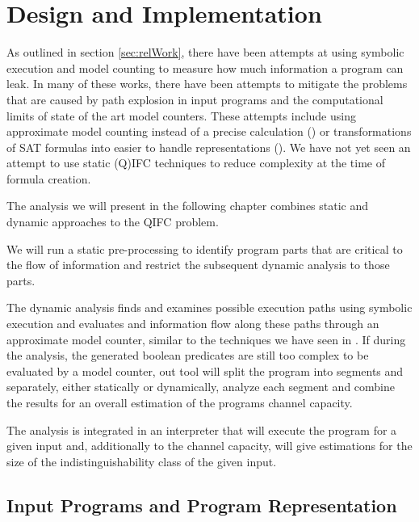 \chapter{Design and Implementation}\label{sec:impl}

As outlined in section \ref{sec:relWork}, there have been attempts at using symbolic execution and model counting to measure how much information a program can leak. In many of these works, there have been attempts to mitigate the problems that are caused by path explosion in input programs and the computational limits of state of the art model counters. These attempts include using approximate model counting instead of a precise calculation (\cite{biondi18, chu19}) or transformations of SAT formulas into easier to handle representations (\cite{klebanov13}). We have not yet seen an attempt to use static (Q)IFC techniques to reduce complexity at the time of formula creation. 

The analysis we will present in the following chapter combines static and dynamic approaches to the QIFC problem. 

We will run a static pre-processing to identify program parts that are critical to the flow of information and restrict the subsequent dynamic analysis to those parts.

The dynamic analysis finds and examines possible execution paths using symbolic execution and evaluates and information flow along these paths through an approximate model counter, similar to the techniques we have seen in \cite{klebanov13, biondi18, chu19}.
If during the analysis, the generated boolean predicates are still too complex to be evaluated by a model counter, out tool will split the program into segments and separately, either statically or dynamically, analyze each segment and combine the results for an overall estimation of the programs channel capacity.

The analysis is integrated in an interpreter that will execute the program for a given input and, additionally to the channel capacity, will give estimations for the size of the indistinguishability class of the given input.



\section{Input Programs and Program Representation}\label{sec:inputLang}

